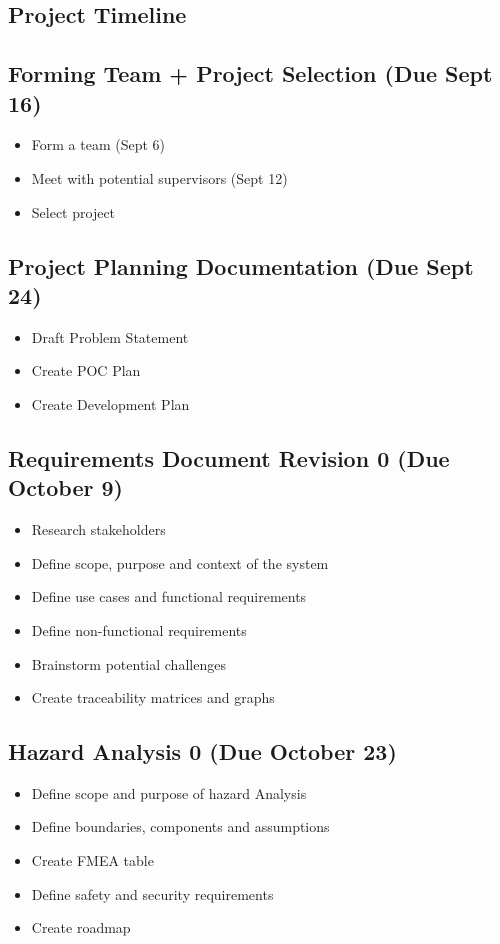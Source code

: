 \documentclass{article}
\begin{document}
\subsection{Project Timeline}

\subsection*{Forming Team + Project Selection (Due Sept 16)}
	\begin{itemize}
		\item Form a team (Sept 6)
		\item Meet with potential supervisors (Sept 12)
		\item Select project
	\end{itemize}

\subsection*{Project Planning Documentation (Due Sept 24)}
	\begin{itemize}
		\item Draft Problem Statement
		\item Create POC Plan
		\item Create Development Plan
	\end{itemize}

	\subsection*{Requirements Document Revision 0 (Due October 9)}
	\begin{itemize}
		\item Research stakeholders
		\item Define scope, purpose and context of the system
		\item Define use cases and functional requirements
		\item Define non-functional requirements
		\item Brainstorm potential challenges
		\item Create traceability matrices and graphs
	\end{itemize}

	\subsection*{Hazard Analysis 0 (Due October 23)}
	\begin{itemize}
		\item Define scope and purpose of hazard Analysis
		\item Define boundaries, components and assumptions
		\item Create FMEA table
		\item Define safety and security requirements
		\item Create roadmap
	\end{itemize}
\end{document}
